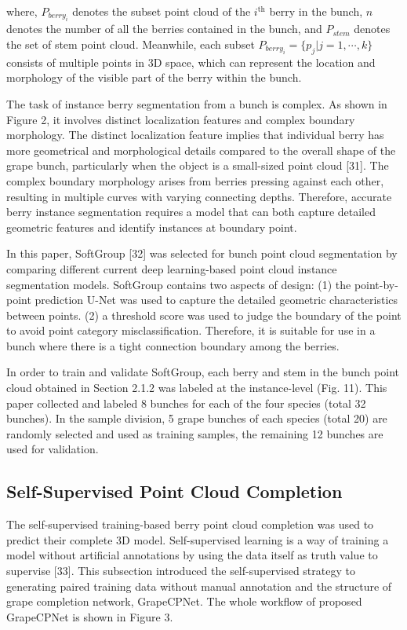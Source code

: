\documentclass[12pt]{article}
\begin{document}
{\raggedright where, $P_{berry_{i}}$ denotes the subset point cloud of the $i^{\text{th}}$ berry in the bunch, $n$ denotes the number of all the berries contained in the bunch, and $P_{stem}$ denotes the set of stem point cloud. 
Meanwhile, each subset $P_{berry_{i}}=\{p_j | j=1, \cdots, k\}$ consists of multiple points in 3D space, which can represent the location and morphology of the visible part of the berry within the bunch.}

The task of instance berry segmentation from a bunch is complex. 
As shown in Figure 2, it involves distinct localization features and complex boundary morphology. 
The distinct localization feature implies that individual berry has more geometrical and morphological details compared to the overall shape of the grape bunch, particularly when the object is a small-sized point cloud [31]. 
The complex boundary morphology arises from berries pressing against each other, resulting in multiple curves with varying connecting depths. 
Therefore, accurate berry instance segmentation requires a model that can both capture detailed geometric features and identify instances at boundary point. 


In this paper, SoftGroup [32] was selected for bunch point cloud segmentation by comparing different current deep learning-based point cloud instance segmentation models. 
SoftGroup contains two aspects of design: 
(1) the point-by-point prediction U-Net was used to capture the detailed geometric characteristics between points. 
(2) a threshold score was used to judge the boundary of the point to avoid point category misclassification. 
Therefore, it is suitable for use in a bunch where there is a tight connection boundary among the berries.

In order to train and validate SoftGroup, each berry and stem in the bunch point cloud obtained in
Section 2.1.2 was labeled at the instance-level (Fig. 11). 
This paper collected and labeled 8 bunches for each of the four species (total 32 bunches). 
In the sample division, 5 grape bunches of each species (total 20) are randomly selected and used as training samples, the remaining 12 bunches are used for validation.

\subsection{Self-Supervised Point Cloud Completion}

The self-supervised training-based berry point cloud completion was used to predict their complete 3D model. 
Self-supervised learning is a way of training a model without artificial annotations by using the data itself as truth value to supervise [33]. 
This subsection introduced the self-supervised strategy to generating paired training data without manual annotation and the structure of grape completion network, GrapeCPNet. 
The whole workflow of proposed GrapeCPNet is shown in Figure 3.
\end{document}
